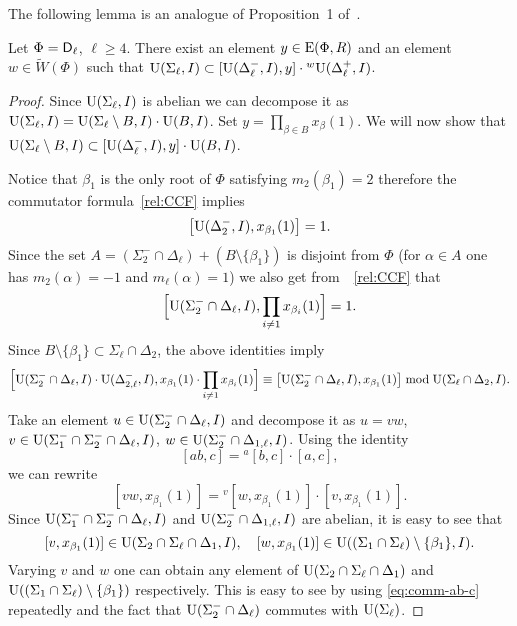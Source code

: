 The following lemma is an analogue of Proposition~1 of~\cite{NikProdDecomp}.
\begin{lemma}\label{lemma:nikolov-type-dl}
Let $\Phi=\mathsf{D}_\ell$, $\ell\geq 4$.
There exist an element $y\in\operatorname{E}(\Phi,R)$ and an element $w\in\widetilde{W}(\Phi)$ such that $\operatorname{U}(\Sigma_\ell, I)\subset[\operatorname{U}(\Delta_\ell^-, I),y]\cdot{}^w\!\operatorname{U}(\Delta_\ell^+, I)$.
\end{lemma}
\begin{proof}
Since $\operatorname{U}(\Sigma_\ell, I)$ is abelian we can decompose it as $\operatorname{U}(\Sigma_\ell, I)=\operatorname{U}(\Sigma_\ell\setminus B, I) \cdot \operatorname{U}(B, I)$. 
Set $y=\prod_{\beta\in B}x_\beta(1)$. We will now show that $\operatorname{U}(\Sigma_\ell\setminus B, I)\subset[\operatorname{U}(\Delta_\ell^-, I),y]\cdot\operatorname{U}(B, I)$.

Notice that $\beta_1$ is the only root of $\Phi$ satisfying $m_2(\beta_1)=2$ therefore the commutator formula~\eqref{rel:CCF} implies
\[ \bigl[\operatorname{U}(\Delta_2^-, I),x_{\beta_1}(1)\bigr]=1. \]
Since the set $A=(\Sigma_2^-\cap\Delta_\ell)+(B\setminus\{\beta_1\})$ is disjoint from $\Phi$ 
(for $\alpha\in A$ one has $m_2(\alpha)=-1$ and $m_\ell(\alpha)=1$)
we also get from~~\eqref{rel:CCF} that
\[\Bigl[\operatorname{U}(\Sigma_2^-\cap\Delta_\ell, I),\prod_{i\neq1}x_{\beta_i}(1)\Bigr]=1. \]
Since $B\setminus\{\beta_1\}\subset\Sigma_\ell\cap\Delta_2$, the above identities imply
\[ \Bigl[ \operatorname{U}(\Sigma_2^-\cap\Delta_\ell, I)\cdot\operatorname{U}(\Delta_{2,\ell}^-, I), x_{\beta_1}(1)\cdot\prod_{i\neq1}x_{\beta_i}(1) \Bigr] \equiv \bigl[ \operatorname{U}(\Sigma_2^-\cap\Delta_\ell, I), x_{\beta_1}(1) \bigr] \bmod \operatorname{U}(\Sigma_\ell\cap\Delta_2, I). \]
Take an element $u\in\operatorname{U}(\Sigma_2^-\cap\Delta_\ell, I)$ and decompose it as $u=vw$, $v\in\operatorname{U}(\Sigma_1^-\cap\Sigma_2^-\cap\Delta_\ell, I)$, $w\in\operatorname{U}(\Sigma_2^-\cap\Delta_{1,\ell}, I)$.
Using the identity
\begin{equation}\label{eq:comm-ab-c}
[ab,c]={}^a[b,c]\cdot[a,c],
\end{equation}
we can rewrite
\[ [vw,x_{\beta_1}(1)] = {}^v[w,x_{\beta_1}(1)]\cdot[v,x_{\beta_1}(1)].  \]
Since $\operatorname{U}(\Sigma_1^-\cap\Sigma_2^-\cap\Delta_\ell, I)$ and $\operatorname{U}(\Sigma_2^-\cap\Delta_{1,\ell}, I)$ are abelian, it is easy to see that
\[ [v,x_{\beta_1}(1)]\in\operatorname{U}(\Sigma_2\cap\Sigma_\ell\cap\Delta_1, I), \quad [w,x_{\beta_1}(1)]\in\operatorname{U}((\Sigma_1\cap\Sigma_\ell)\setminus\{\beta_1\}, I). \]
Varying $v$ and $w$ one can obtain any element of $\operatorname{U}(\Sigma_2\cap\Sigma_\ell\cap\Delta_1)$ and $\operatorname{U}((\Sigma_1\cap\Sigma_\ell)\setminus\{\beta_1\})$ respectively. This is easy to see by using \eqref{eq:comm-ab-c} repeatedly and the fact that $\operatorname{U}(\Sigma_2^-\cap\Delta_\ell)$ commutes with $\operatorname{U}(\Sigma_\ell)$.

\end{proof}
